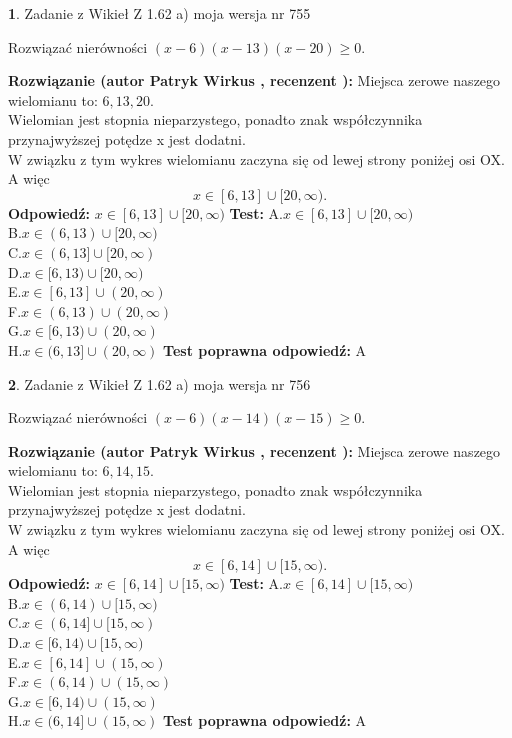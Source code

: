 \documentclass[12pt, a4paper]{article}
\theoremstyle{definition} %
\newtheorem{zad}{}
\newcommand{\zadStart}[1]{\begin{zad}#1\newline}
\newcommand{\zadStop}{\end{zad}}
\newcommand{\rozwStart}[2]{\noindent \textbf{Rozwiązanie (autor #1 , recenzent #2): }\newline}
\newcommand{\rozwStop}{\newline}
\newcommand{\odpStart}{\noindent \textbf{Odpowiedź:}\newline}
\newcommand{\odpStop}{\newline}
\newcommand{\testStart}{\noindent \textbf{Test:}\newline}
\newcommand{\testStop}{\newline}
\newcommand{\kluczStart}{\noindent \textbf{Test poprawna odpowiedź:}\newline}
\newcommand{\kluczStop}{\newline}
\begin{document}
\zadStart{Zadanie z Wikieł Z 1.62 a) moja wersja nr 755}

Rozwiązać nierówności $(x-6)(x-13)(x-20)\ge0$.
\zadStop
\rozwStart{Patryk Wirkus}{}
Miejsca zerowe naszego wielomianu to: $6, 13, 20$.\\
Wielomian jest stopnia nieparzystego, ponadto znak współczynnika przy\linebreak najwyższej potędze x jest dodatni.\\ W związku z tym wykres wielomianu zaczyna się od lewej strony poniżej osi OX. A więc $$x \in [6,13] \cup [20,\infty).$$
\rozwStop
\odpStart
$x \in [6,13] \cup [20,\infty)$
\odpStop
\testStart
A.$x \in [6,13] \cup [20,\infty)$\\
B.$x \in (6,13) \cup [20,\infty)$\\
C.$x \in (6,13] \cup [20,\infty)$\\
D.$x \in [6,13) \cup [20,\infty)$\\
E.$x \in [6,13] \cup (20,\infty)$\\
F.$x \in (6,13) \cup (20,\infty)$\\
G.$x \in [6,13) \cup (20,\infty)$\\
H.$x \in (6,13] \cup (20,\infty)$
\testStop
\kluczStart
A
\kluczStop



\zadStart{Zadanie z Wikieł Z 1.62 a) moja wersja nr 756}

Rozwiązać nierówności $(x-6)(x-14)(x-15)\ge0$.
\zadStop
\rozwStart{Patryk Wirkus}{}
Miejsca zerowe naszego wielomianu to: $6, 14, 15$.\\
Wielomian jest stopnia nieparzystego, ponadto znak współczynnika przy\linebreak najwyższej potędze x jest dodatni.\\ W związku z tym wykres wielomianu zaczyna się od lewej strony poniżej osi OX. A więc $$x \in [6,14] \cup [15,\infty).$$
\rozwStop
\odpStart
$x \in [6,14] \cup [15,\infty)$
\odpStop
\testStart
A.$x \in [6,14] \cup [15,\infty)$\\
B.$x \in (6,14) \cup [15,\infty)$\\
C.$x \in (6,14] \cup [15,\infty)$\\
D.$x \in [6,14) \cup [15,\infty)$\\
E.$x \in [6,14] \cup (15,\infty)$\\
F.$x \in (6,14) \cup (15,\infty)$\\
G.$x \in [6,14) \cup (15,\infty)$\\
H.$x \in (6,14] \cup (15,\infty)$
\testStop
\kluczStart
A
\kluczStop
\end{document}
